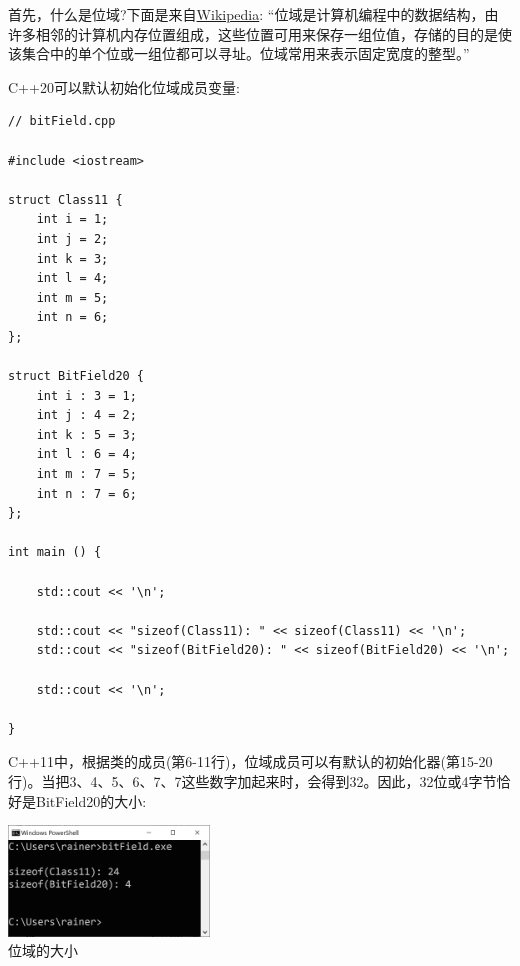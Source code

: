 首先，什么是位域?下面是来自\href{https://en.wikipedia.org/wiki/Bit_field}{Wikipedia}: “位域是计算机编程中的数据结构，由许多相邻的计算机内存位置组成，这些位置可用来保存一组位值，存储的目的是使该集合中的单个位或一组位都可以寻址。位域常用来表示固定宽度的整型。”

C++20可以默认初始化位域成员变量:

\begin{lstlisting}[style=styleCXX]
// bitField.cpp

#include <iostream>

struct Class11 {
	int i = 1;
	int j = 2;
	int k = 3;
	int l = 4;
	int m = 5;
	int n = 6;
};

struct BitField20 {
	int i : 3 = 1;
	int j : 4 = 2;
	int k : 5 = 3;
	int l : 6 = 4;
	int m : 7 = 5;
	int n : 7 = 6;
};

int main () {
	
	std::cout << '\n';
	
	std::cout << "sizeof(Class11): " << sizeof(Class11) << '\n';
	std::cout << "sizeof(BitField20): " << sizeof(BitField20) << '\n';
	
	std::cout << '\n';

}
\end{lstlisting}

C++11中，根据类的成员(第6-11行)，位域成员可以有默认的初始化器(第15-20行)。当把3、4、5、6、7、7这些数字加起来时，会得到32。因此，32位或4字节恰好是BitField20的大小:

\begin{center}
\includegraphics[width=0.4\textwidth]{content/3/chapter4/images/49.png}\\
位域的大小
\end{center}

